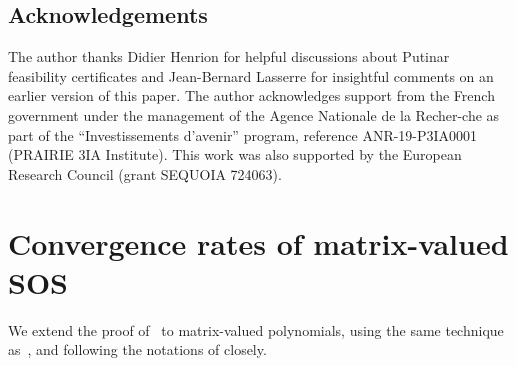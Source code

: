 \documentclass[11pt]{article}
\begin{document}
 
 \subsection*{Acknowledgements}
The author thanks Didier Henrion for helpful discussions about Putinar feasibility certificates and Jean-Bernard Lasserre for insightful comments on an earlier version of this paper. The author acknowledges support
from the French government under the management of the Agence Nationale de la {Recher-che} as part of the ``Investissements d’avenir'' program, reference ANR-19-P3IA0001 (PRAIRIE 3IA Institute). This work was also supported by the European Research Council (grant SEQUOIA 724063).



\appendix

\section{Convergence rates of matrix-valued SOS}
\label{app:matrixSOS} 
We extend the proof of~\cite[Theorem 1]{bach2022exponential} to matrix-valued polynomials, using the same technique as~\cite{fang2021sum}, and following the notations of \cite{bach2022exponential} closely.
\end{document}

